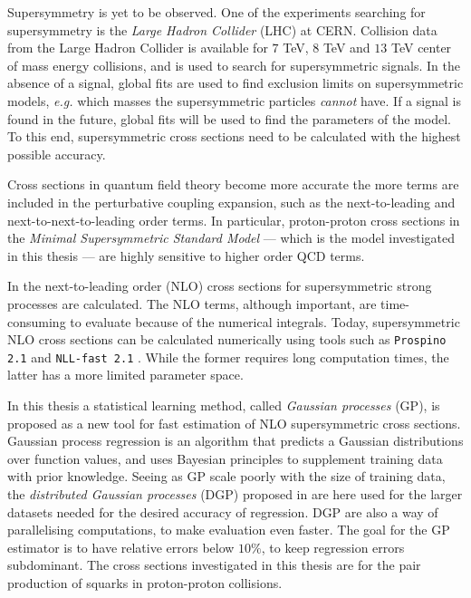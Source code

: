 \documentclass[twoside,english]{uiofysmaster}
\begin{document}
Supersymmetry is yet to be observed. One of the experiments searching for supersymmetry is the \textit{Large Hadron Collider} (LHC) at CERN. Collision data from the Large Hadron Collider is available for $7$ TeV, $8$ TeV and $13$ TeV center of mass energy collisions, and is used to search for supersymmetric signals. In the absence of a signal, global fits are used to find exclusion limits on supersymmetric models, \textit{e.g.} which masses the supersymmetric particles \textit{cannot} have. If a signal is found in the future, global fits will be used to find the parameters of the model. To this end, supersymmetric cross sections need to be calculated with the highest possible accuracy.

Cross sections in quantum field theory become more accurate the more terms are included in the perturbative coupling expansion, such as the next-to-leading and next-to-next-to-leading order terms. In particular, proton-proton cross sections in the \textit{Minimal Supersymmetric Standard Model} --- which is the model investigated in this thesis --- are highly sensitive to higher order QCD terms.

In \cite{Beenakker:1996ch} the next-to-leading order (NLO) cross sections for supersymmetric strong processes are calculated. The NLO terms, although important, are time-consuming to evaluate because of the numerical integrals. Today, supersymmetric NLO cross sections can be calculated numerically using tools such as \verb|Prospino 2.1| \cite{Beenakker:1996ed} and \verb|NLL-fast 2.1| \cite{Beenakker:2015rna}. While the former requires long computation times, the latter has a more limited parameter space. 

In this thesis a statistical learning method, called \textit{Gaussian processes} (GP), is proposed as a new tool for fast estimation of NLO supersymmetric cross sections. Gaussian process regression is an algorithm that predicts a Gaussian distributions over function values, and uses Bayesian principles to supplement training data with prior knowledge. Seeing as GP scale poorly with the size of training data, the \textit{distributed Gaussian processes} (DGP) proposed in \cite{deisenroth2015distributed} are here used for the larger datasets needed for the desired accuracy of regression. DGP are also a way of parallelising computations, to make evaluation even faster. The goal for the GP estimator is to have relative errors below $10\%$, to keep regression errors subdominant. The cross sections investigated in this thesis are for the pair production of squarks in proton-proton collisions.
\end{document}
